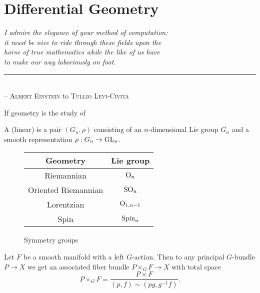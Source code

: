\chapter{Differential Geometry}

\begin{flushleft}
	\textsl{I admire the elegance of your method of computation;}\\
	\textsl{it must be nice to ride through these fields upon the}\\
  \textsl{horse of true mathematics while the like of us have}\\
  \textsl{to make our way laboriously on foot.}\\
	\rule[0pt]{24em}{0.5pt}\\
	-- \textsc{Albert Einstein} to \textsc{Tullio Levi-Civita}\\
	\vspace{2em}
\end{flushleft}

If geometry is the study of 
\begin{definition}
  A (linear)  is a pair $(G_n,\rho)$ consisting 
  of an $n$-dimensional Lie group $G_n$ and a smooth representation $\rho : G_n \to {\operatorname{GL}}_n$.
\end{definition}

\begin{figure}[ht]
  \centering
  \begin{tabular}{|c|c|}
    \hline
    \textbf{Geometry} & \textbf{Lie group} \\
    \hline
    Riemannian & ${\operatorname{O}}_n$ \\
    Oriented Riemannian & ${\operatorname{SO}}_n$ \\
    Lorentzian & ${\operatorname{O}}_{1,n-1}$ \\
    Spin & ${\operatorname{Spin}}_n$\\
    \hline
  \end{tabular}\vspace{0.5em}
  \caption{Symmetry groups}
\end{figure}


\begin{definition}
  Let $F$ be a smooth manifold with a left $G$-action. Then to any principal $G$-bundle $P \to X$ we get an associated fiber bundle $P\times_G F \to X$ with total space
  \[
    P\times_G F = \frac{P\times F}{(p,f) \sim (pg, g^{-1}f)}.
  \]
\end{definition}

